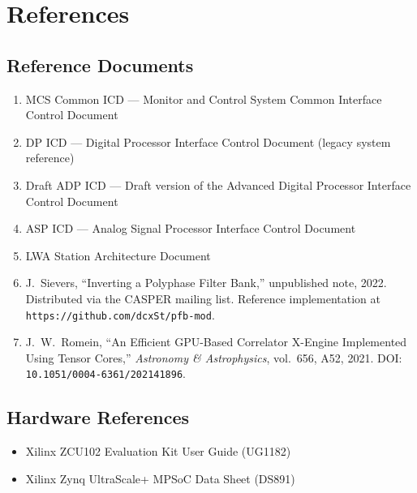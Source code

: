 
\chapter{References}
\label{sec:references}

\section{Reference Documents}

\begin{enumerate}
    \item MCS Common ICD --- Monitor and Control System Common Interface Control Document

    \item DP ICD --- Digital Processor Interface Control Document (legacy system reference)

    \item Draft ADP ICD --- Draft version of the Advanced Digital Processor Interface Control Document

    \item ASP ICD --- Analog Signal Processor Interface Control Document

    \item LWA Station Architecture Document

    \item \label{ref:sievers-pfb} J.~Sievers, ``Inverting a Polyphase Filter Bank,'' unpublished note, 2022.  Distributed via the CASPER mailing list.  Reference implementation at \texttt{https://github.com/dcxSt/pfb-mod}.

    \item \label{ref:tcc} J.~W.~Romein, ``An Efficient GPU-Based Correlator X-Engine Implemented Using Tensor Cores,'' \emph{Astronomy \& Astrophysics}, vol.~656, A52, 2021.  DOI: \texttt{10.1051/0004-6361/202141896}.

\end{enumerate}

\section{Hardware References}

\begin{itemize}
    \item Xilinx ZCU102 Evaluation Kit User Guide (UG1182)
    \item Xilinx Zynq UltraScale+ MPSoC Data Sheet (DS891)
\end{itemize}

